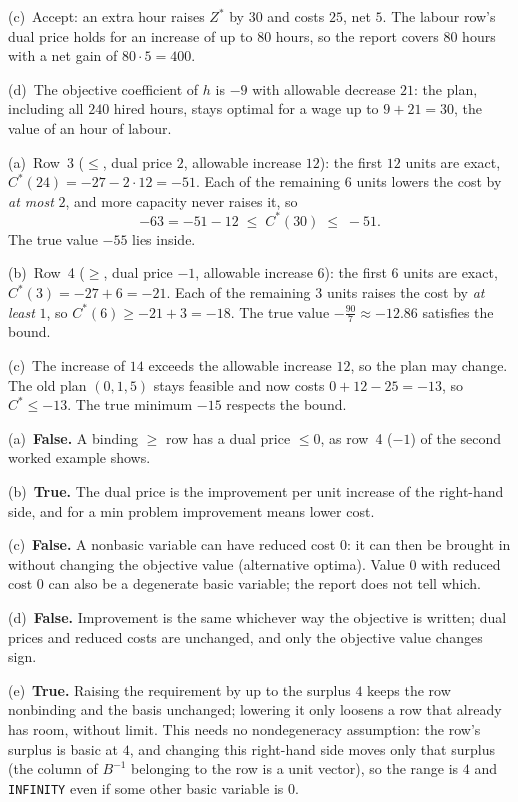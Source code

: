 \begin{solutions}
        (c)~Accept: an extra hour raises $Z^{*}$ by $30$ and costs $25$,
        net $5$. The labour row's dual price holds for an increase of up to
        $80$ hours, so the report covers $80$ hours with a net gain of
        $80\cdot5=400$.

        (d)~The objective coefficient of $h$ is $-9$ with allowable
        decrease $21$: the plan, including all $240$ hired hours, stays
        optimal for a wage up to $9+21=30$, the value of an hour of labour.

  \item (a)~Row~3 ($\le$, dual price $2$, allowable increase $12$): the
        first $12$ units are exact, $C^{*}(24)=-27-2\cdot12=-51$. Each of
        the remaining $6$ units lowers the cost by \emph{at most} $2$, and
        more capacity never raises it, so
        \[
          -63=-51-12\;\le\;C^{*}(30)\;\le\;-51 .
        \]
        The true value $-55$ lies inside.

        (b)~Row~4 ($\ge$, dual price $-1$, allowable increase $6$): the
        first $6$ units are exact, $C^{*}(3)=-27+6=-21$. Each of the
        remaining $3$ units raises the cost by \emph{at least} $1$, so
        $C^{*}(6)\ge -21+3=-18$. The true value
        $-\tfrac{90}{7}\approx-12.86$ satisfies the bound.

        (c)~The increase of $14$ exceeds the allowable increase $12$, so
        the plan may change. The old plan $(0,1,5)$ stays feasible and now
        costs $0+12-25=-13$, so $C^{*}\le -13$. The true minimum $-15$
        respects the bound.

  \item (a)~\textbf{False.} A binding $\ge$ row has a dual price
        $\le 0$, as row~4 ($-1$) of the second worked example shows.

        (b)~\textbf{True.} The dual price is the improvement per unit
        increase of the right-hand side, and for a min problem improvement
        means lower cost.

        (c)~\textbf{False.} A nonbasic variable can have reduced cost $0$:
        it can then be brought in without changing the objective value
        (alternative optima). Value $0$ with reduced cost $0$ can also be a
        degenerate basic variable; the report does not tell which.

        (d)~\textbf{False.} Improvement is the same whichever way the
        objective is written; dual prices and reduced costs are unchanged,
        and only the objective value changes sign.

        (e)~\textbf{True.} Raising the requirement by up to the surplus $4$
        keeps the row nonbinding and the basis unchanged; lowering it only
        loosens a row that already has room, without limit. This needs
        no nondegeneracy assumption: the row's surplus is basic at $4$,
        and changing this right-hand side moves only that surplus (the
        column of $B^{-1}$ belonging to the row is a unit vector), so the
        range is $4$ and \texttt{INFINITY} even if some other basic
        variable is $0$.
\end{solutions}
